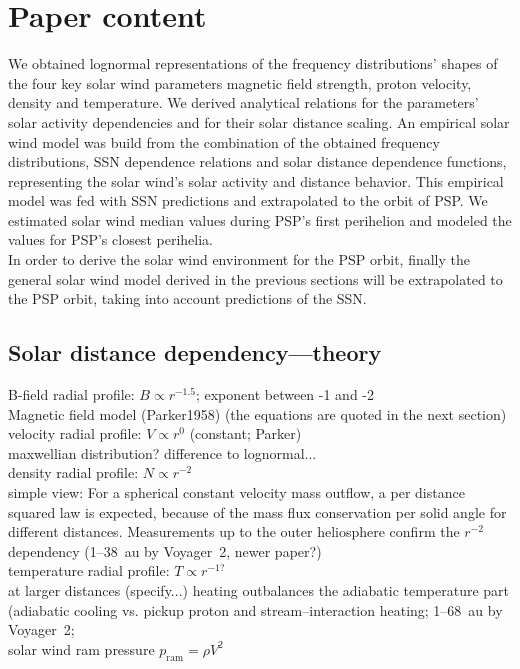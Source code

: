 \section{Paper content}
We obtained lognormal representations of the frequency distributions’ shapes of the four key solar wind parameters magnetic field strength, proton velocity, density and temperature. We derived analytical relations for the parameters’ solar activity dependencies and for their solar distance scaling. An empirical solar wind model was build from the combination of the obtained frequency distributions, SSN dependence relations and solar distance dependence functions, representing the solar wind’s solar activity and distance behavior. This empirical model was fed with SSN predictions and extrapolated to the orbit of PSP. We estimated solar wind median values during PSP’s first perihelion and modeled the values for PSP’s closest perihelia.\\

In order to derive the solar wind environment for the PSP orbit, finally the general solar wind model derived in the previous sections will be extrapolated to the PSP orbit, taking into account predictions of the SSN.\\


\subsection{Solar distance dependency---theory}
B-field radial profile: $B \propto r^{-1.5}$; exponent between -1 and -2\\
	Magnetic field model (Parker1958) (the equations are quoted in the next section)\\
velocity radial profile: $V \propto r^{0}$ (constant; Parker)\\
	maxwellian distribution? difference to lognormal...\\
density radial profile: $N \propto r^{-2}$\\
	simple view: For a spherical constant velocity mass outflow, a per distance squared law is expected, because of the mass flux conservation per solid angle for different distances. Measurements up to the outer heliosphere confirm the $r^{-2}$ dependency (1--38~au by Voyager~2, \citep{Belcher1993} newer paper?)\\

temperature radial profile: $T \propto r^{-1?}$\\
	at larger distances (specify...) heating outbalances the adiabatic temperature part (adiabatic cooling vs. pickup proton and stream--interaction heating; 1--68~au by Voyager~2; \citet{Richardson2003}\\
solar wind ram pressure $p_\text{ram} = \rho V^2$\\


